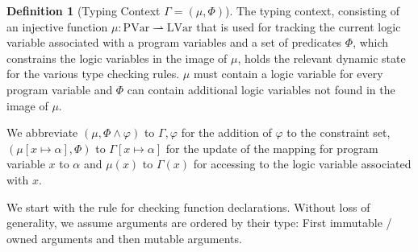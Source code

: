 \documentclass[twoside, english]{sdqthesis}
\theoremstyle{definition}
\newtheorem{definition}[theorem]{Definition}
\begin{document}
\begin{definition}[Typing Context $\Gamma = (\mu, \Phi)$]
  The typing context, consisting of an injective function $\mu : \text{PVar} \rightharpoonup \text{LVar}$ that is used for tracking the current logic variable associated with a program variables and a set of predicates $\Phi$, which constrains the logic variables in the image of $\mu$, holds the relevant dynamic state for the various type checking rules.
  $\mu$ must contain a logic variable for every program variable and $\Phi$ can contain additional logic variables not found in the image of $\mu$.

  We abbreviate $(\mu, \Phi \wedge \varphi)$ to $\Gamma, \varphi$ for the addition of $\varphi$ to the constraint set, $(\mu[x \mapsto \alpha], \Phi)$ to $\Gamma[x \mapsto \alpha]$ for the update of the mapping for program variable $x$ to $\alpha$ and 
  $\mu(x)$ to $\Gamma(x)$ for accessing to the logic variable associated with $x$.
\end{definition}

We start with the rule for checking function declarations.
Without loss of generality, we assume arguments are ordered by their type: First immutable / owned arguments and then mutable arguments.
\end{document}
